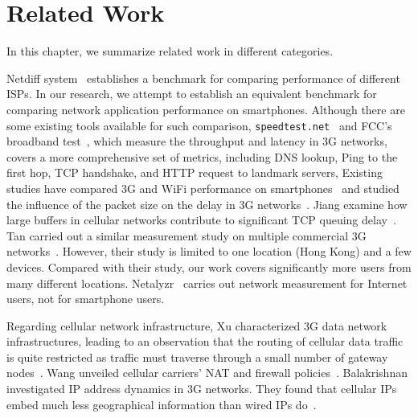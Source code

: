 \chapter{Related Work}
\label{chap:related}

In this chapter, we summarize related work in different categories.


Netdiff system~\cite{Mahajan:NSDI2008:NetDiff} establishes a benchmark for comparing performance of different ISPs. In our research, we attempt to establish an equivalent benchmark for comparing network application performance on smartphones. Although there are some existing tools available for such comparison, \eg \texttt{speedtest.net}~\cite{speedtestnet} and FCC's broadband test~\cite{fccspeedtest}, which measure the throughput and latency in 3G networks, \mobiperf covers a more comprehensive set of metrics, including DNS lookup, Ping to the first hop, TCP handshake, and HTTP request to landmark servers, \etc Existing studies have compared 3G and WiFi performance on smartphones~\cite{Gass:3GWiFi:PAM2010} and studied the influence of the packet size on the delay in 3G networks~\cite{Arlos:OneWay:PAM2010}. Jiang \etal examine how large buffers in cellular networks contribute to significant TCP queuing delay~\cite{jiang12}. Tan \etal carried out a similar measurement study on multiple commercial 3G networks~\cite{wltan07}. However, their study is limited to one location (Hong Kong) and a few devices. Compared with their study, our work covers significantly more users from many different locations. Netalyzr~\cite{netalyzr} carries out network measurement for Internet users, not for smartphone users.

Regarding cellular network infrastructure, Xu \etal characterized 3G data network infrastructures, leading to an observation that the routing of cellular data traffic is quite restricted as traffic must traverse through a small number of gateway nodes~\cite{sigmetrics.cluster}. %
Wang \etal unveiled cellular carriers' NAT and firewall policies~\cite{sigcomm.nat}. %
Balakrishnan \etal investigated IP address dynamics in 3G networks. They found that cellular IPs embed much less geographical
information than wired IPs do~\cite{Mahesh:Ephemera:IMC09}. 

